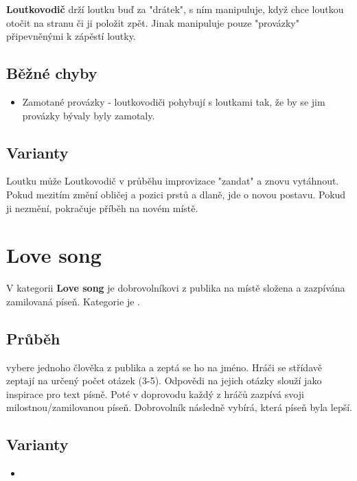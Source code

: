 \documentclass[main.tex]{subfiles}
\begin{document}
\textbf{Loutkovodič}{} drží loutku buď  za "drátek", s ním manipuluje, když chce loutkou otočit na stranu či ji položit zpět. 
Jinak manipuluje pouze "provázky"{} připevněnými k zápěstí loutky.   
  
\subsection{ Běžné chyby } \begin{itemize}
\item  Zamotané provázky - loutkovodiči pohybují s loutkami tak, že by se jim provázky bývaly byly zamotaly.
\end{itemize}
 
 
\subsection{Varianty} Loutku může Loutkovodič v průběhu improvizace "zandat"{} a znovu vytáhnout. Pokud mezitím změní obličej a pozici prstů a dlaně, jde o novou postavu. Pokud ji nezmění, pokračuje příběh na novém místě.  
 
 
 
\needspace{5cm} \section{Love song} \label{love song}  
 
 
V kategorii \textbf{Love song}{} je dobrovolníkovi z publika na místě složena a zazpívána zamilovaná píseň. Kategorie je . 
 
 
\subsection{Průběh}  vybere jednoho člověka z publika a zeptá se ho na jméno. Hráči se střídavě zeptají na určený počet otázek (3-5). Odpovědi na jejich otázky slouží jako inspirace pro text písně. Poté v doprovodu  každý z hráčů zazpívá svoji milostnou/zamilovanou píseň. Dobrovolník následně vybírá, která píseň byla lepší. 
 
\subsection{ Varianty } \begin{itemize}
\item {}
\end{itemize}
 
\end{document}
